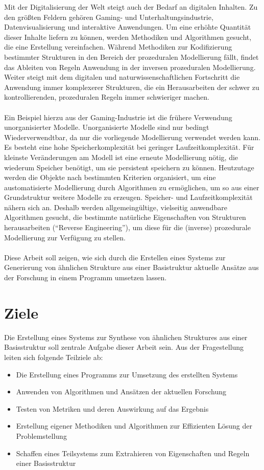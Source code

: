 Mit der Digitalisierung der Welt steigt auch der Bedarf an digitalen Inhalten.
Zu den größten Feldern gehören Gaming- und Unterhaltungsindustrie, Datenvisualisierung und interaktive Anwendungen.
Um eine erhöhte Quantität dieser Inhalte liefern zu können, werden Methodiken und Algorithmen gesucht, die eine Erstellung
vereinfachen.
Während Methodiken zur Kodifizierung bestimmter Strukturen in den Bereich der prozeduralen Modellierung fällt,
findet das Ableiten von Regeln Anwendung in der inversen prozeduralen Modellierung.
Weiter steigt mit dem digitalen und naturwissenschaftlichen Fortschritt die Anwendung immer komplexerer Strukturen, die
ein Herausarbeiten der schwer zu kontrollierenden, prozeduralen Regeln immer schwieriger machen.
\\~\\
Ein Beispiel hierzu aus der Gaming-Industrie ist die frühere Verwendung unorganisierter Modelle.
Unorganisierte Modelle sind nur bedingt Wiederverwendtbar, da nur die vorliegende Modellierung verwendet werden kann.
Es besteht eine hohe Speicherkomplexität bei geringer Laufzeitkomplexität.
Für kleinste Veränderungen am Modell ist eine erneute Modellierung nötig, die wiederum Speicher benötigt, um sie
persistent speichern zu können.
Heutzutage werden die Objekte nach bestimmten Kriterien organisiert, um eine austomatisierte Modellierung durch Algorithmen
zu ermöglichen, um so aus einer Grundstruktur weitere Modelle zu erzeugen.
Speicher- und Laufzeitkomplexität nähern sich an.
Deshalb werden allgemeingültige, vielseitig anwendbare Algorithmen gesucht, die bestimmte natürliche Eigenschaften
von Strukturen herausarbeiten ("`Reverse Engineering"'), um diese für die (inverse) prozedurale Modellierung zur
Verfügung zu stellen.
\\~\\
Diese Arbeit soll zeigen, wie sich durch die Erstellen eines Systems zur Generierung von ähnlichen Strukture aus einer
Basistruktur aktuelle Ansätze aus der Forschung in einem Programm umsetzen lassen.

\newpage

\section{Ziele}

Die Erstellung eines Systems zur Synthese von ähnlichen Struktures aus einer Basisstruktur soll zentrale Aufgabe dieser
Arbeit sein.
Aus der Fragestellung leiten sich folgende Teilziele ab:

\begin{itemize}
    \item Die Erstellung eines Programms zur Umsetzung des erstellten Systems
    \item Anwenden von Algorithmen und Ansätzen der aktuellen Forschung
    \item Testen von Metriken und deren Auswirkung auf das Ergebnis
    \item Erstellung eigener Methodiken und Algorithmen zur Effizienten Lösung der Problemstellung
    \item Schaffen eines Teilsystems zum Extrahieren von Eigenschaften und Regeln einer Basisstruktur
\end{itemize}

